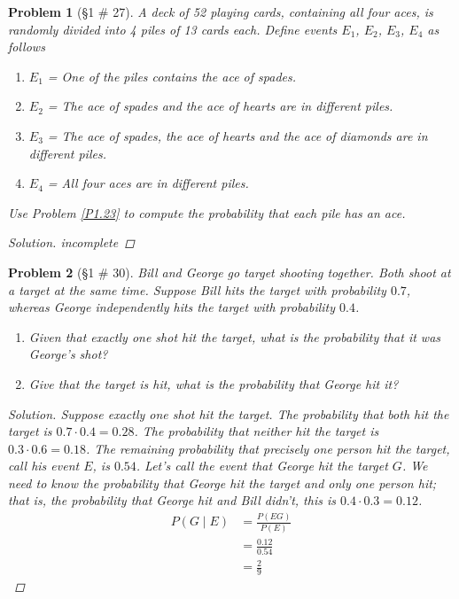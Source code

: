 \documentclass[11pt, oneside]{book}   	%
\newtheorem{problem}{Problem}[chapter]
\begin{document}
\begin{spacing}{1.618}
\begin{problem}[\S 1 \# 27]
	A deck of 52 playing cards, containing all four aces, is randomly divided into 4 piles of 13 cards each. Define events $E_1$, $E_2$, $E_3$, $E_4$ as follows
	\begin{enumerate}
		\item $E_1$ = One of the piles contains the ace of spades.
		\item $E_2$ = The ace of spades and the ace of hearts are in different piles.
		\item $E_3$ = The ace of spades, the ace of hearts and the ace of diamonds are in different piles. 
		\item $E_4$ = All four aces are in different piles.
	\end{enumerate}
	Use Problem \ref{P1.23} to compute the probability that each pile has an ace. 
	\begin{proof}[Solution]
		incomplete
	\end{proof}
\end{problem}

\begin{problem}[\S 1 \# 30]
	Bill and George go target shooting together. Both shoot at a target at the same time. Suppose Bill hits the target with probability $0.7$, whereas George independently hits the target with probability $0.4$. 
	\begin{enumerate}
		\item Given that exactly one shot hit the target, what is the probability that it was George's shot? 
		\item Give that the target is hit, what is the probability that George hit it? 
	\end{enumerate}
	\begin{proof}[Solution]
		Suppose exactly one shot hit the target. The probability that both hit the target is $0.7\cdot 0.4=0.28$. The probability that neither hit the target is $0.3\cdot 0.6=0.18$. The remaining probability that precisely one person hit the target, call his event $E$, is $0.54$. Let's call the event that George hit the target $G$. We need to know the probability that George hit the target and only one person hit; that is, the probability that George hit and Bill didn't, this is $0.4\cdot 0.3 = 0.12$. 
		\begin{alignat*}{4}
			P(G\mid E) &= \frac{P(EG)}{P(E)} \\
				&=\frac{0.12}{0.54} \\ 
				&=\frac{2}{9}
		\end{alignat*}
		

\end{proof}
\end{problem}
\end{spacing}
\end{document}
